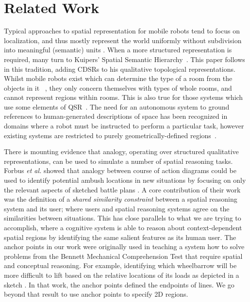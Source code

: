\documentclass[letterpaper]{article}
\begin{document}
\section{Related Work}


Typical approaches to spatial representation for mobile robots tend to focus on localization, and thus mostly represent the world uniformly without subdivision into meaningful (semantic) units \cite{Thrun02a}. When a more structured representation is required, many turn to Kuipers' Spatial Semantic Hierarchy~\cite{Kuipers:2000}. This paper follows in this tradition, adding CDSRs to his qualitative topological representations. Whilst mobile robots exist which can determine the type of a room from the objects in it ~\cite{Hanheide/etal:2010a,Galindo/etal:2005a}, they only concern themselves with types of whole rooms, and cannot represent regions within rooms. This is also true for those systems which use some elements of QSR~\cite{aydemir2011icra}. The need for an autonomous system to ground references to human-generated descriptions of space has been recognized in domains where a robot must be instructed to perform a particular task, however existing systems are restricted to purely geometrically-defined regions~\cite{Tellex:2011,Dzifcak/etal:2009,brenneretal07ijcai}.


There is mounting evidence that analogy, operating over structured qualitative representations, can be used to simulate a number of spatial reasoning tasks. Forbus \textit{et al.} showed that analogy between course of action diagrams could be used to identify potential ambush locations in new situations by focusing on only the relevant aspects of sketched battle plans \cite{Forbus/etal2003}. A core contribution of their work was the definition of a \textit{shared similarity constraint} between a spatial reasoning system and its user; where users and spatial reasoning systems agree on the similarities between situations. This has close parallels to what we are trying to accomplish, where a cognitive system is able to reason about context-dependent spatial regions by identifying the same salient features as its human user. The anchor points in our work were originally used in teaching a system how to solve problems from the Bennett Mechanical Comprehension Test that require spatial and conceptual reasoning. For example, identifying which wheelbarrow will be more difficult to lift based on the relative locations of its loads as depicted in a sketch \cite{Klenk/etal2005}. In that work, the anchor points defined the endpoints of lines. We go beyond that result to use anchor points to specify 2D regions.  
\end{document}
